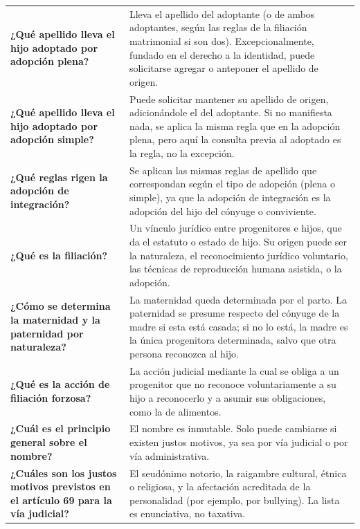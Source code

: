 \documentclass[12pt,oneside]{book}
\begin{document}
\begin{longtable}{
    >{\raggedright\arraybackslash}p{}
    >{\raggedright\arraybackslash}p{}
}
\textbf{¿Qué apellido lleva el hijo adoptado por adopción plena?} &
Lleva el apellido del adoptante (o de ambos adoptantes, según las reglas de la filiación matrimonial si son dos). Excepcionalmente, fundado en el derecho a la identidad, puede solicitarse agregar o anteponer el apellido de origen. \\

\textbf{¿Qué apellido lleva el hijo adoptado por adopción simple?} &
Puede solicitar mantener su apellido de origen, adicionándole el del adoptante. Si no manifiesta nada, se aplica la misma regla que en la adopción plena, pero aquí la consulta previa al adoptado es la regla, no la excepción. \\

\textbf{¿Qué reglas rigen la adopción de integración?} &
Se aplican las mismas reglas de apellido que correspondan según el tipo de adopción (plena o simple), ya que la adopción de integración es la adopción del hijo del cónyuge o conviviente. \\

\textbf{¿Qué es la filiación?} &
Un vínculo jurídico entre progenitores e hijos, que da el estatuto o estado de hijo. Su origen puede ser la naturaleza, el reconocimiento jurídico voluntario, las técnicas de reproducción humana asistida, o la adopción. \\

\textbf{¿Cómo se determina la maternidad y la paternidad por naturaleza?} &
La maternidad queda determinada por el parto. La paternidad se presume respecto del cónyuge de la madre si esta está casada; si no lo está, la madre es la única progenitora determinada, salvo que otra persona reconozca al hijo. \\

\textbf{¿Qué es la acción de filiación forzosa?} &
La acción judicial mediante la cual se obliga a un progenitor que no reconoce voluntariamente a su hijo a reconocerlo y a asumir sus obligaciones, como la de alimentos. \\

\textbf{¿Cuál es el principio general sobre el nombre?} &
El nombre es inmutable. Solo puede cambiarse si existen justos motivos, ya sea por vía judicial o por vía administrativa. \\

\textbf{¿Cuáles son los justos motivos previstos en el artículo 69 para la vía judicial?} &
El seudónimo notorio, la raigambre cultural, étnica o religiosa, y la afectación acreditada de la personalidad (por ejemplo, por bullying). La lista es enunciativa, no taxativa. \\


\end{longtable}
\end{document}
